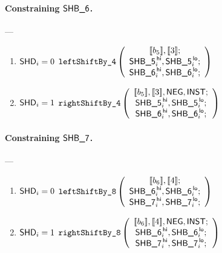 \paragraph{Constraining $\textsf{SHB\_6}$.} ---
\begin{enumerate}
	\item \If $\textsf{SHD}_{i} = 0$ \Then $\texttt{leftShiftBy\_4}
		\left( \begin{array}{c}
			[\![b_{5}]\!], [\![3]\!]; \\
			\textsf{SHB\_5}^{\mathsf{\,hi}}_{i}, \textsf{SHB\_5}^{\mathsf{\,lo}}_{i}; \\
			\textsf{SHB\_6}^{\mathsf{\,hi}}_{i}, \textsf{SHB\_6}^{\mathsf{\,lo}}_{i}; \\
		\end{array}\right)$
	\item \If $\textsf{SHD}_{i} = 1$ \Then $\texttt{rightShiftBy\_4}
		\left( \begin{array}{c}
			[\![b_{5}]\!], [\![3]\!], \textsf{NEG}, \textsf{INST}; \\
			\textsf{SHB\_5}^{\mathsf{\,hi}}_{i}, \textsf{SHB\_5}^{\mathsf{\,lo}}_{i}; \\
			\textsf{SHB\_6}^{\mathsf{\,hi}}_{i}, \textsf{SHB\_6}^{\mathsf{\,lo}}_{i}; \\
		\end{array}\right)$
\end{enumerate}

\paragraph{Constraining $\textsf{SHB\_7}$.} ---
\begin{enumerate}
	\item \If $\textsf{SHD}_{i} = 0$ \Then $\texttt{leftShiftBy\_8}
		\left( \begin{array}{c}
			[\![b_{6}]\!], [\![4]\!]; \\
			\textsf{SHB\_6}^{\mathsf{\,hi}}_{i}, \textsf{SHB\_6}^{\mathsf{\,lo}}_{i}; \\
			\textsf{SHB\_7}^{\mathsf{\,hi}}_{i}, \textsf{SHB\_7}^{\mathsf{\,lo}}_{i}; \\
		\end{array}\right)$
	\item \If $\textsf{SHD}_{i} = 1$ \Then $\texttt{rightShiftBy\_8}
		\left( \begin{array}{c}
			[\![b_{6}]\!], [\![4]\!], \textsf{NEG}, \textsf{INST}; \\
			\textsf{SHB\_6}^{\mathsf{\,hi}}_{i}, \textsf{SHB\_6}^{\mathsf{\,lo}}_{i}; \\
			\textsf{SHB\_7}^{\mathsf{\,hi}}_{i}, \textsf{SHB\_7}^{\mathsf{\,lo}}_{i}; \\
		\end{array}\right)$
\end{enumerate}

